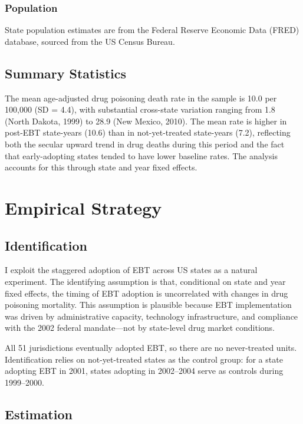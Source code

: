 \documentclass[12pt]{article}
\begin{document}
\subsubsection*{Population} State population estimates are from the Federal Reserve Economic Data (FRED) database, sourced from the US Census Bureau.

\subsection{Summary Statistics}



The mean age-adjusted drug poisoning death rate in the sample is 10.0 per 100,000 (SD = 4.4), with substantial cross-state variation ranging from 1.8 (North Dakota, 1999) to 28.9 (New Mexico, 2010). The mean rate is higher in post-EBT state-years (10.6) than in not-yet-treated state-years (7.2), reflecting both the secular upward trend in drug deaths during this period and the fact that early-adopting states tended to have lower baseline rates. The analysis accounts for this through state and year fixed effects.

\section{Empirical Strategy}
\label{sec:strategy}

\subsection{Identification}

I exploit the staggered adoption of EBT across US states as a natural experiment. The identifying assumption is that, conditional on state and year fixed effects, the timing of EBT adoption is uncorrelated with changes in drug poisoning mortality. This assumption is plausible because EBT implementation was driven by administrative capacity, technology infrastructure, and compliance with the 2002 federal mandate---not by state-level drug market conditions.

All 51 jurisdictions eventually adopted EBT, so there are no never-treated units. Identification relies on not-yet-treated states as the control group: for a state adopting EBT in 2001, states adopting in 2002--2004 serve as controls during 1999--2000.

\subsection{Estimation}
\end{document}
